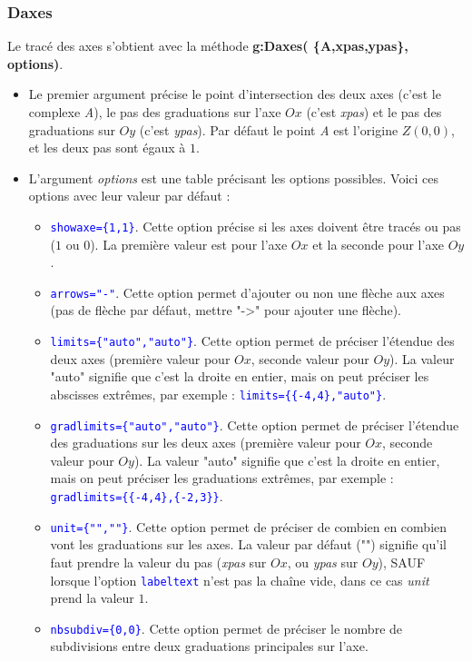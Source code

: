 \documentclass[%
10pt,%
a4paper,%
french,%
]%
{article}%
\begin{document}
\subsubsection{Daxes}
\def\opt#1{\textcolor{blue}{\texttt{#1}}}%
Le tracé des axes s'obtient avec la méthode \textbf{g:Daxes( \{A,xpas,ypas\}, options)}.
\begin{itemize}
    \item Le premier argument précise le point d'intersection des deux axes (c'est le complexe \emph{A}), le pas des graduations sur l'axe $Ox$ (c'est \emph{xpas}) et le pas des graduations sur $Oy$ (c'est \emph{ypas}). Par défaut le point \emph{A} est l'origine $Z(0,0)$, et les deux pas sont égaux à $1$.
    \item L'argument \emph{options} est une table précisant les options possibles. Voici ces options avec leur valeur par défaut :
        \begin{itemize}
            \item \opt{showaxe=\{1,1\}}. Cette option précise si les axes doivent être tracés ou pas ($1$ ou $0$). La première valeur est pour l'axe $Ox$ et la seconde pour l'axe $Oy$.
            \item \opt{arrows="-"}. Cette option permet d'ajouter ou non une flèche aux axes (pas de flèche par défaut, mettre "->" pour ajouter une flèche).
            \item \opt{limits=\{"auto","auto"\}}. Cette option permet de préciser l'étendue des deux axes (première valeur pour $Ox$, seconde valeur pour $Oy$). La valeur "auto" signifie que c'est la droite en entier, mais on peut préciser les abscisses extrêmes, par exemple : \opt{limits=\{\{-4,4\},"auto"\}}.
            \item \opt{gradlimits=\{"auto","auto"\}}. Cette option permet de préciser l'étendue des graduations sur les deux axes (première valeur pour $Ox$, seconde valeur pour $Oy$). La valeur "auto" signifie que c'est la droite en entier, mais on peut préciser les graduations extrêmes, par exemple : \opt{gradlimits=\{\{-4,4\},\{-2,3\}\}}.
            \item \opt{unit=\{"",""\}}. Cette option permet de préciser de combien en combien vont les graduations sur les axes. La valeur par défaut ("") signifie qu'il faut prendre la valeur du pas (\emph{xpas} sur $Ox$, ou \emph{ypas} sur $Oy$), SAUF lorsque l'option \opt{labeltext} n'est pas la chaîne vide, dans ce cas \emph{unit} prend la valeur $1$.
            \item \opt{nbsubdiv=\{0,0\}}. Cette option permet de préciser le nombre de subdivisions entre deux graduations principales sur l'axe.

\end{itemize}
\end{itemize}
\end{document}
